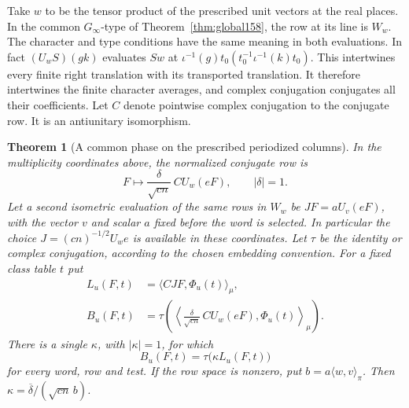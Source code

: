 \documentclass[a4paper,11pt]{article}
\newtheorem{theorem}[proposition]{Theorem}
\theoremstyle{definition}
\theoremstyle{remark}
\numberwithin{equation}{section}
\begin{document}
Take \(w\) to be the tensor product of the prescribed unit vectors
at the real places. In the common \(G_\infty\)-type of
Theorem~\ref{thm:global158}, the row at its line is \(W_w\).
The character and type conditions have the same meaning in both
evaluations. In fact
\((U_w S)(gk)\) evaluates \(S w\) at
\(\iota^{-1}(g)t_0(t_0^{-1}\iota^{-1}(k)t_0)\).
This intertwines every finite right translation with its transported
translation. It therefore intertwines the finite character
averages, and complex conjugation conjugates all their coefficients.
Let \(C\) denote pointwise complex conjugation to the conjugate
row. It is an antiunitary isomorphism.

\begin{theorem}[A common phase on the prescribed periodized columns]\leavevmode
\label{thm:commonphase441}
In the multiplicity coordinates above, the normalized conjugate row is
\[
       F\longmapsto \frac{\delta}{\sqrt{cn}}\ C U_w(eF),
                        \qquad |\delta|=1.
\]
Let a second isometric evaluation of the same rows in \(W_w\) be
\(JF=a U_v(eF)\), with the vector \(v\) and scalar \(a\) fixed
before the word is selected. In particular the choice
\(J=(cn)^{-1/2}U_w e\) is available in these coordinates.
Let \(\tau\) be the identity or complex conjugation, according to
the chosen embedding convention. For a fixed class table \(t\)
put
\[
 \begin{aligned}
    L_u(F,t)&=\langle CJF,\Phi_u(t)\rangle_\mu,\\
    B_u(F,t)&=\tau\!\left(
       \left\langle\frac{\delta}{\sqrt{cn}}\, C U_w(eF),
                        \Phi_u(t)\right\rangle_\mu\right).
 \end{aligned}
\]
There is a single \(\kappa\), with \(|\kappa|=1\), for which
\[
                       B_u(F,t)=\tau\bigl(\kappa L_u(F,t)\bigr)
\]
for every word, row and test. If the row space is nonzero, put
\(b=a\langle w,v\rangle_\pi\). Then
\(\kappa=\overline\delta/(\sqrt{cn}\,b)\).
\end{theorem}
\end{document}
